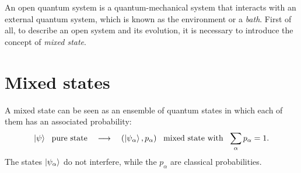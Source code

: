 
An open quantum system is a quantum-mechanical system that interacts with an external quantum system, which is known as the environment or a \textit{bath}. First of all, to describe an open system and its evolution, it is necessary to introduce the concept of \textit{mixed state}. 

\section{Mixed states}

A mixed state can be seen as an ensemble of quantum states in which each of them has an associated probability:
\begin{align*}
    \ket{\psi} ~~\text{pure state} \quad \longrightarrow \quad \left( \ket{\psi_\alpha}, p_\alpha \right) ~~\text{mixed state with} ~~\sum_\alpha p_\alpha = 1. 
\end{align*}
The states $\ket{\psi_\alpha}$ do not interfere, while the $p_\alpha$ are classical probabilities.

